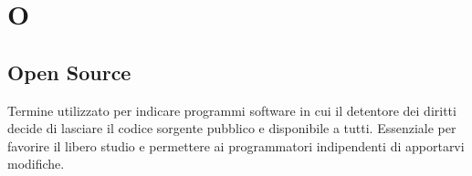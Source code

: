 \section*{O}

\subsection{Open Source}
Termine utilizzato per indicare programmi software in cui il detentore dei diritti decide di lasciare il codice sorgente pubblico e disponibile a tutti. Essenziale per favorire il libero studio e permettere ai programmatori indipendenti di apportarvi modifiche.

